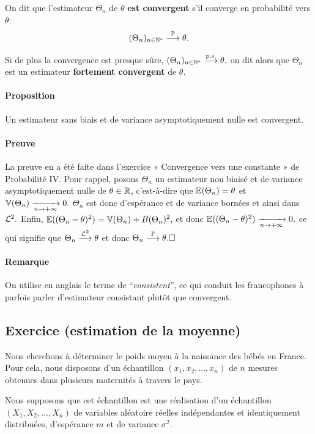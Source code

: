 On dit que l'estimateur $\Theta_n$ de $\theta$ \textbf{est convergent} s'il
converge en probabilité vers $\theta:$
\begin{equation}
  \label{eq:estimateur_convergent}
  (\Theta_n)_{n \in \mathbb{N}^*} \stackrel{\mathbb{P}}{\longrightarrow} \theta.
\end{equation}

Si de plus la convergence est presque sûre,
$(\Theta_n)_{n \in \mathbb{N}^*} \stackrel{\text{p.s.}}{\longrightarrow} \theta,$ on dit alors que $\Theta_n$ est un
estimateur \textbf{fortement convergent} de $\theta$.

\paragraph{Proposition} Un estimateur sans biais et de variance
asymptotiquement nulle est convergent.

\paragraph{Preuve} La preuve en a été faite dans l'exercice « Convergence vers
une constante » de Probabilité IV. Pour rappel, posons $\Theta_n$ un estimateur
non biaisé et de variance asymptotiquement nulle de $\theta \in \mathbb{R}$,
c'est-à-dire que $\mathbb{E}(\Theta_n) = \theta$ et $\mathbb{V}(\Theta_n) \xrightarrow[n \rightarrow +\infty]{} 0.$ $\Theta_n$
est donc d'espérance et de variance bornées et ainsi dans $\mathcal{L}^2.$ Enfin,
$  \mathbb{E}((\Theta_n - \theta)^2) = \mathbb{V}(\Theta_n) + B(\Theta_n)^2,$
et donc $\mathbb{E}((\Theta_n - \theta)^2) \xrightarrow[n \rightarrow +\infty]{} 0,$ ce qui signifie que
$\Theta_n \stackrel{\mathcal{L}^2}{\longrightarrow} \theta$ et donc $\Theta_n \cvproba \theta. \hfill \square$

\paragraph{Remarque} On utilise en anglais le terme de ``\textit{consistent}'',
ce qui conduit les francophones à parfois parler d'estimateur consistant plutôt
que convergent.

\subsection{Exercice (estimation de la moyenne)}
\label{sec:exo_proprietes}
Nous cherchons à déterminer le poids moyen à la naissance des bébés en
France. Pour cela, nous disposons d'un échantillon $(x_1, x_2, \dots, x_n)$ de
$n$ mesures obtenues dans plusieurs maternités à travers le pays.

Nous supposons que cet échantillon est une réalisation d'un échantillon
$(X_1, X_2, \dots, X_n)$ de variables aléatoire réelles indépendantes et
identiquement distribuées, d'espérance $m$ et de variance $\sigma^2$.

